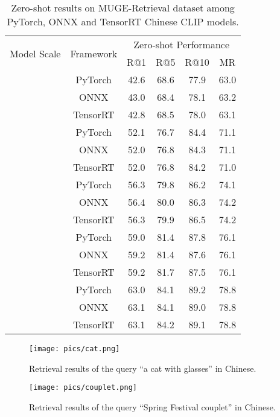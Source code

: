 \documentclass[11pt]{article}
\begin{document}
\begin{table*}[t]
\center
\small
\begin{adjustbox}{max width=1.\textwidth}
\begin{tabular}{@{\extracolsep{\fill}}lccccc}
\toprule
  \multirow{2}{*}{Model Scale} & \multirow{2}{*}{Framework}
  &\multicolumn{4}{c}{Zero-shot Performance}
  \\
   &  & R@1 & R@5 & R@10 & MR
  \\
\midrule
  \multirow{3}{*}{}
  & PyTorch	& 42.6	& 68.6	& 77.9	& 63.0 
  \\
  & ONNX	& 43.0 & 68.4 & 78.1 & 63.2
  \\
  & TensorRT	& 42.8 & 68.5 & 78.0 & 63.1
  \\ \midrule
  \multirow{3}{*}{}
  & PyTorch	& 52.1	& 76.7	& 84.4	& 71.1 
  \\
  & ONNX	& 52.0	& 76.8	& 84.3	& 71.1	
  \\
  & TensorRT	& 52.0	& 76.8	& 84.2	& 71.0
  \\ \midrule
  \multirow{3}{*}{}
  & PyTorch	& 56.3	& 79.8	& 86.2	& 74.1 
  \\
  & ONNX	& 56.4	& 80.0	& 86.3	& 74.2	
  \\
  & TensorRT	& 56.3 & 79.9	& 86.5	& 74.2
  \\ \midrule
  \multirow{3}{*}{}
  & PyTorch	& 59.0	& 81.4	& 87.8	& 76.1
  \\
  & ONNX	& 59.2	& 81.4 & 87.6 & 76.1
  \\
  & TensorRT	& 59.2 & 81.7 & 87.5 & 76.1
  \\ \midrule
  \multirow{3}{*}{}
  & PyTorch	& 63.0	& 84.1	& 89.2	& 78.8 
  \\
  & ONNX	& 63.1	& 84.1	& 89.0	& 78.8	
  \\
  & TensorRT	& 63.1	& 84.2	& 89.1	& 78.8
  \\

\bottomrule
\end{tabular}
\end{adjustbox}
\caption{Zero-shot results on MUGE-Retrieval dataset among PyTorch, ONNX and TensorRT Chinese CLIP models.}
\label{tb:deployment_muge}
\end{table*} 
\begin{figure*}[h] 
    \centering
    \texttt{[image: pics/cat.png]}
    \caption{Retrieval results of the query ``a cat with glasses'' in Chinese.}
    \label{fig:demo_cat}
\end{figure*}

\begin{figure*}[h] 
    \centering
    \texttt{[image: pics/couplet.png]}
    \caption{Retrieval results of the query ``Spring Festival couplet'' in Chinese.}
    \label{fig:demo_couplet}
\end{figure*} 
\end{document}

